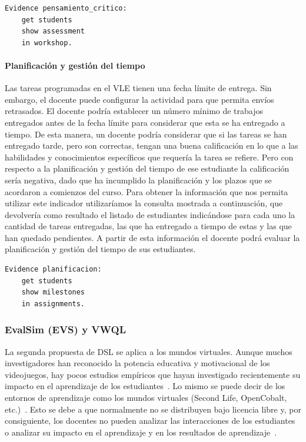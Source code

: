 \begin{verbatim}
Evidence pensamiento_critico:  
	get students 
	show assessment 
	in workshop.
\end{verbatim}

				\paragraph*{Planificación y gestión del tiempo}
				Las tareas programadas en el VLE tienen una fecha límite de entrega. Sin embargo, el docente puede configurar la actividad para que permita envíos retrasados. El docente podría establecer un número mínimo de trabajos entregados antes de la fecha límite para considerar que esta se ha entregado a tiempo. De esta manera, un docente podría considerar que si las tareas se han entregado tarde, pero son correctas, tengan una buena calificación en lo que a las habilidades y conocimientos específicos que requería la tarea se refiere. Pero con respecto a la planificación y gestión del tiempo de ese estudiante la calificación sería negativa, dado que ha incumplido la planificación y los plazos que se acordaron a comienzos del curso. Para obtener la información que nos permita utilizar este indicador utilizaríamos la consulta mostrada a continuación, que devolvería como resultado el listado de estudiantes indicándose para cada uno la cantidad de tareas entregadas, las que ha entregado a tiempo de estas y las que han quedado pendientes. A partir de esta información el docente podrá evaluar la planificación y gestión del tiempo de sus estudiantes.

\begin{verbatim}
Evidence planificacion:  
	get students 
	show milestones 
	in assignments.
\end{verbatim}

		\subsubsection{EvalSim (EVS) y VWQL} \label{subcha:evs}

		La segunda propuesta de DSL se aplica a los mundos virtuales. Aunque muchos investigadores han reconocido la potencia educativa y motivacional de los videojuegos, hay pocos estudios empíricos que hayan investigado recientemente su impacto en el aprendizaje de los estudiantes~\cite{berns2013game}. Lo mismo se puede decir de los entornos de aprendizaje como los mundos virtuales (Second Life, OpenCobalt, etc.)~\cite{hew2010use}. Esto se debe a que normalmente no se distribuyen bajo licencia libre y, por consiguiente, los docentes no pueden analizar las interacciones de los estudiantes o analizar su impacto en el aprendizaje y en los resultados de aprendizaje~\cite{cruz2015discovering,moreno2014serious}. 

